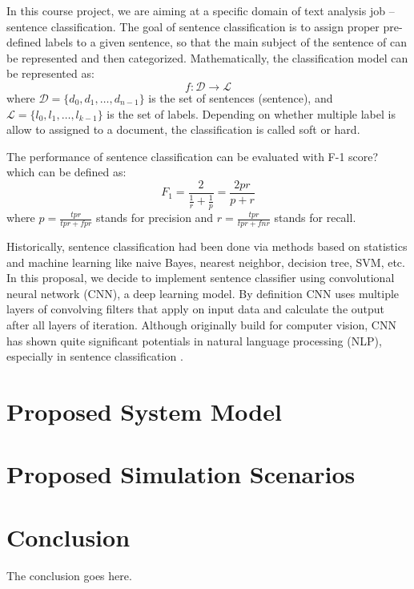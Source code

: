 \documentclass[conference]{IEEEtran}
\begin{document}
    In this course project, we are aiming at a specific domain of text analysis
    job -- sentence classification. The goal of sentence classification is to assign
    proper pre-defined labels to a given sentence, so that the main subject of the 
    sentence of can be represented and then categorized\cite{allahyari2017brief}. 
    Mathematically, the classification model can be represented as:
    $$f:\mathcal{D}\rightarrow\mathcal{L}$$
    where $\mathcal{D}=\{d_0, d_1,\ldots, d_{n-1}\}$ is the set of sentences
    (sentence), and $\mathcal{L}=\{l_0, l_1,\ldots, l_{k-1}\}$ is the set of labels.
    Depending on whether multiple label is allow to assigned to a document, the 
    classification is called soft or hard\cite{gopal2010multilabel}.
    
    The performance of sentence classification can be evaluated with F-1 score?
    which can be defined as\cite{forman2003extensive}:
    $$F_1=\frac{2}{\frac{1}{r}+\frac{1}{p}}=\frac{2pr}{p+r}$$
    where $p=\frac{tpr}{tpr+fpr}$ stands for precision and $r=\frac{tpr}{tpr+fnr}$ 
    stands for recall.
    
    Historically, sentence classification had been done via methods based on 
    statistics and machine learning like naive Bayes, nearest neighbor, decision 
    tree, SVM, etc. In this proposal, we decide to implement sentence classifier
    using convolutional neural network (CNN), a deep learning model. By definition
    CNN uses multiple layers of convolving filters that apply on input data and 
    calculate the output after all layers of iteration. Although originally 
    build for computer vision, CNN has shown quite significant potentials in 
    natural language processing (NLP), especially in sentence classification
    \cite{kim2014convolutional}.

\section{Proposed System Model}

\section{Proposed Simulation Scenarios}

\section{Conclusion}
The conclusion goes here.



\end{document}
